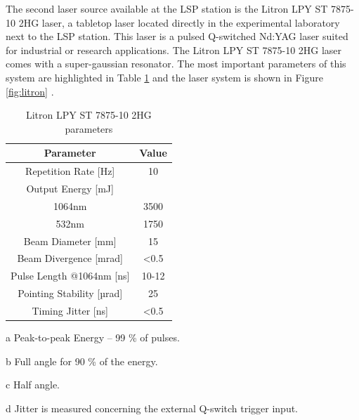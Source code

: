 The second laser source available at the LSP station is the Litron LPY ST 7875-10 2HG laser, a tabletop laser located directly in the experimental laboratory next to the LSP station. This laser is a pulsed Q-switched Nd:YAG laser suited for industrial or research applications. The Litron  LPY ST 7875-10 2HG laser comes with a super-gaussian resonator. The most important parameters of this system are highlighted in Table \ref{tab:litronparameters} and the laser system is shown in Figure \ref{fig:litron} \cite{litron}. 


\begin{table}[h!] 
\centering
    \begin{threeparttable}
        \begin{tabular}{|c | c|} 
        \hline
            \textbf{Parameter} & \textbf{Value} \\ [0.5ex] 
        \hline
        Repetition Rate [Hz] & 10  \\ 
        \hline
            Output Energy [mJ] & \\
            1064nm & 3500 \\
            532nm & 1750 \\
        \hline
            Beam Diameter [mm] & 15 \tnote{a} \\
        \hline
            Beam Divergence [mrad] & <0.5 \tnote{b} \\ 
        \hline
            Pulse Length @1064nm [ns] & 10-12 \\
        \hline
            Pointing Stability [µrad] & 25 \tnote{c} \\
        \hline
            Timing Jitter [ns] & <0.5 \tnote{d}  \\
        \hline
        \end{tabular}
        \begin{tablenotes}
            \small
            \item[a] Peak-to-peak Energy -- 99 \% of pulses. 
            \item[b] Full angle for 90 \% of the energy.
            \item[c] Half angle.
            \item[d] Jitter is measured concerning the external Q-switch trigger input.
        \end{tablenotes}
        
    \end{threeparttable}
        \caption{Litron LPY ST 7875-10 2HG parameters \cite{litronmanual}}
\label{tab:litronparameters}
\end{table}

